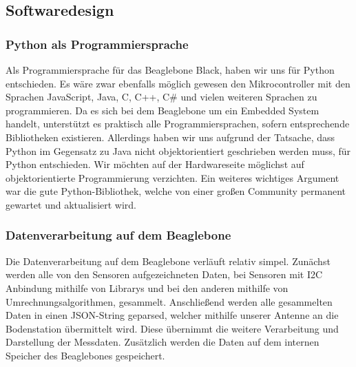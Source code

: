 \subsection{Softwaredesign}
\subsubsection{Python als Programmiersprache}
Als Programmiersprache für das Beaglebone Black, haben wir uns für Python entschieden. Es wäre zwar ebenfalls möglich gewesen den Mikrocontroller mit den Sprachen JavaScript, Java, C, C++, C\# und vielen weiteren Sprachen zu programmieren. Da es sich bei dem Beaglebone um ein Embedded System handelt, unterstützt es praktisch alle Programmiersprachen, sofern entsprechende Bibliotheken existieren. Allerdings haben wir uns aufgrund der Tatsache, dass Python im Gegensatz zu Java nicht objektorientiert geschrieben werden muss, für Python entschieden. Wir möchten auf der Hardwareseite möglichst auf objektorientierte Programmierung verzichten. Ein weiteres wichtiges Argument war die gute Python-Bibliothek, welche von einer großen Community permanent gewartet und aktualisiert wird.
\subsubsection{Datenverarbeitung auf dem Beaglebone}
Die Datenverarbeitung auf dem Beaglebone verläuft relativ simpel. Zunächst werden alle von den Sensoren aufgezeichneten Daten, bei Sensoren mit I2C Anbindung mithilfe von Librarys und bei den anderen mithilfe von Umrechnungsalgorithmen, gesammelt. Anschließend werden alle gesammelten Daten in einen JSON-String geparsed, welcher mithilfe unserer Antenne an die Bodenstation übermittelt wird. Diese übernimmt die weitere Verarbeitung und Darstellung der Messdaten. Zusätzlich werden die Daten auf dem internen Speicher des Beaglebones gespeichert.
